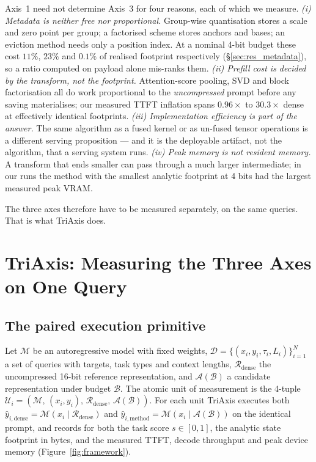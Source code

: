 \documentclass[sigplan,10pt,anonymous,review,nonacm]{acmart}
\newcommand{\sys}{TriAxis}
\begin{document}
Axis~1 need not determine Axis~3 for four reasons, each of which we measure.
\emph{(i) Metadata is neither free nor proportional.} Group-wise quantisation
stores a scale and zero point per group; a factorised scheme stores anchors
and bases; an eviction method needs only a position index. At a nominal 4-bit
budget these cost $11\%$, $23\%$ and $0.1\%$ of realised footprint
respectively (\S\ref{sec:res_metadata}), so a ratio computed on payload alone
mis-ranks them.
\emph{(ii) Prefill cost is decided by the transform, not the footprint.}
Attention-score pooling, SVD and block factorisation all do work proportional
to the \emph{uncompressed} prompt before any saving materialises; our measured
TTFT inflation spans $0.96\times$ to $30.3\times$ dense at effectively
identical footprints.
\emph{(iii) Implementation efficiency is part of the answer.} The same
algorithm as a fused kernel or as un-fused tensor operations is a different
serving proposition --- and it is the deployable artifact, not the algorithm,
that a serving system runs.
\emph{(iv) Peak memory is not resident memory.} A transform that ends smaller
can pass through a much larger intermediate; in our runs the method with the
smallest analytic footprint at 4 bits had the largest measured peak VRAM.

\noindent The three axes therefore have to be measured separately, on the same
queries. That is what \sys{} does.

\section{\sys{}: Measuring the Three Axes on One Query}
\label{sec:sys}

\subsection{The paired execution primitive}

Let $\mathcal{M}$ be an autoregressive model with fixed weights,
$\mathcal{D} = \{(x_i, y_i, \tau_i, L_i)\}_{i=1}^N$ a set of queries with
targets, task types and context lengths, $\mathcal{R}_{\text{dense}}$ the
uncompressed 16-bit reference representation, and $\mathcal{A}(\mathcal{B})$ a
candidate representation under budget $\mathcal{B}$. The atomic unit of
measurement is the 4-tuple
$\mathcal{U}_i = (\mathcal{M},\,(x_i,y_i),\,\mathcal{R}_{\text{dense}},\,
\mathcal{A}(\mathcal{B}))$. For each unit \sys{} executes both
$\hat{y}_{i,\text{dense}} = \mathcal{M}(x_i \mid \mathcal{R}_{\text{dense}})$
and $\hat{y}_{i,\text{method}} = \mathcal{M}(x_i \mid \mathcal{A}(\mathcal{B}))$
on the identical prompt, and records for both the task score
$s \in [0,1]$, the analytic state footprint in bytes, and the measured TTFT,
decode throughput and peak device memory (Figure~\ref{fig:framework}).
\end{document}
